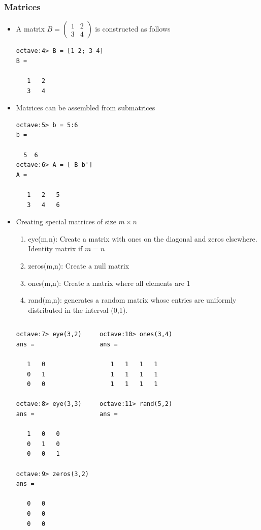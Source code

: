 \documentclass[t,compress,xcolor=svgnames]{beamer}
\begin{document}
\begin{frame}
  \frametitle{\small Matrices}
  \begin{itemize}
    \item A matrix $B=\left(\begin{array}{cc}1 & 2 \\ 3 & 4 \end{array}\right)$ is constructed as follows
    \begin{verbatim}
octave:4> B = [1 2; 3 4]
B =

   1   2
   3   4
    \end{verbatim}
    \item Matrices can be assembled from submatrices
    \begin{verbatim}
octave:5> b = 5:6
b =

  5  6
octave:6> A = [ B b']
A =

   1   2   5
   3   4   6
    \end{verbatim}
    \framebreak
    \item Creating special matrices of size $m\times n$
    \begin{enumerate}
      \item eye(m,n): Create a matrix with ones on the diagonal and zeros elsewhere. Identity matrix if $m=n$
      \item zeros(m,n): Create a null matrix
      \item ones(m,n): Create a matrix where all elements are 1
      \item rand(m,n): generates a random matrix whose entries are uniformly distributed in the interval (0,1).
    \end{enumerate}
    {\tiny
    \begin{columns}
      \column{4cm}
      \begin{verbatim}
octave:7> eye(3,2)
ans =

   1   0
   0   1
   0   0

octave:8> eye(3,3)
ans =

   1   0   0
   0   1   0
   0   0   1

octave:9> zeros(3,2)
ans =

   0   0
   0   0
   0   0
      \end{verbatim}
      \column{4cm}
      \begin{verbatim}
octave:10> ones(3,4)
ans =

   1   1   1   1
   1   1   1   1
   1   1   1   1

octave:11> rand(5,2)
ans =


\end{verbatim}
\end{columns}}
\end{itemize}
\end{frame}
\end{document}
